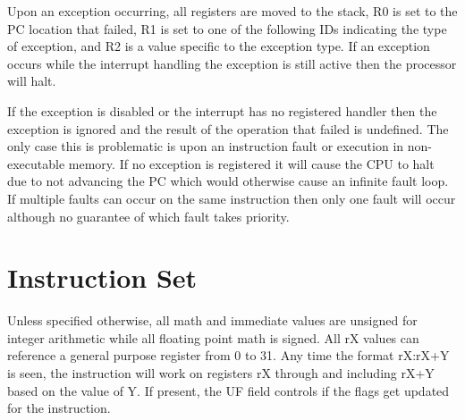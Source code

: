 Upon an exception occurring, all registers are moved to the stack, R0 is set to the PC location that failed, R1 is set to one of the following IDs indicating the type of exception, and R2 is a value specific to the exception type. If an exception occurs while the interrupt handling the exception is still active then the processor will halt.








If the exception is disabled or the interrupt has no registered handler then the exception is ignored and the result of the operation that failed is undefined. The only case this is problematic is upon an instruction fault or execution in non-executable memory. If no exception is registered it will cause the CPU to halt due to not advancing the PC which would otherwise cause an infinite fault loop. If multiple faults can occur on the same instruction then only one fault will occur although no guarantee of which fault takes priority.




\chapter{Instruction Set}

Unless specified otherwise, all math and immediate values are unsigned for integer arithmetic while all floating point math is signed. All rX values can reference a general purpose register from 0 to 31. Any time the format rX:rX+Y is seen, the instruction will work on registers rX through and including rX+Y based on the value of Y. If present, the UF field controls if the flags get updated for the instruction.





